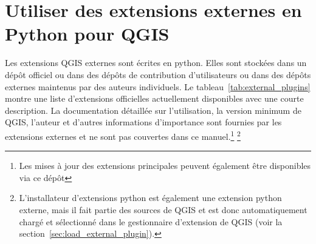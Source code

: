 \section{Utiliser des extensions externes en Python pour QGIS}\label{sec:external_plugins}



Les extensions QGIS externes sont écrites en python. Elles sont stockées dans un dépôt officiel ou dans des dépôts de contribution d'utilisateurs ou dans des dépôts externes maintenus par des auteurs individuels. Le tableau~\ref{tab:external_plugins} montre une liste d'extensions officielles actuellement disponibles avec une courte description. La documentation détaillée sur l'utilisation, la version minimum de QGIS, l'auteur et d'autres informations d'importance sont fournies par les extensions externes et ne sont pas couvertes dans ce manuel.\footnote{Les mises à jour des extensions principales peuvent également être disponibles via ce dépôt} \footnote{L'installateur d'extensions python est également une extension python externe, mais il fait partie des sources de QGIS et est donc automatiquement chargé et sélectionné dans le gestionnaire d'extension de QGIS (voir la section~\ref{sec:load_external_plugin}).}

